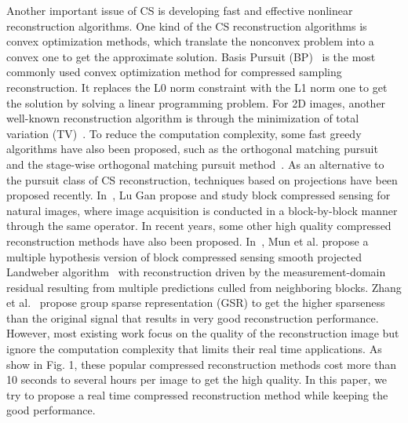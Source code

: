 \documentclass[5pt]{article}
\begin{document}
Another important issue of CS is developing fast and effective nonlinear reconstruction algorithms. One kind of the CS reconstruction algorithms is convex optimization methods, which translate the nonconvex problem into a convex one to get the approximate solution. Basis Pursuit (BP)~\cite{rf6} is the most commonly used convex optimization method for compressed sampling reconstruction. It replaces the L0 norm constraint with the L1 norm one to get the solution by solving a linear programming problem. For 2D images, another well-known reconstruction algorithm is through the minimization of total variation (TV)~\cite{rf7}. To reduce the computation complexity, some fast greedy algorithms have also been proposed, such as the orthogonal matching pursuit~\cite{rf8} and the stage-wise orthogonal matching pursuit method~\cite{rf9}. As an alternative to the pursuit class of CS reconstruction, techniques based on projections have been proposed recently. In~\cite{rf1}, Lu Gan propose and study block compressed sensing for natural images, where image acquisition is conducted in a block-by-block manner through the same operator. In recent years, some other high quality compressed reconstruction methods have also been proposed. In~\cite{rf10}, Mun et al. propose a multiple hypothesis version of block compressed sensing smooth projected Landweber algorithm~\cite{rf1} with reconstruction driven by the measurement-domain residual resulting from multiple predictions culled from neighboring blocks. Zhang et al.~\cite{rf11} propose group sparse representation (GSR) to get the higher sparseness than the original signal that results in very good reconstruction performance. However, most existing work focus on the quality of the reconstruction image but ignore the computation complexity that limits their real time applications. As show in Fig. 1, these popular compressed reconstruction methods cost more than 10 seconds to several hours per image to get the high quality. In this paper, we try to propose a real time compressed reconstruction method while keeping the good performance.
\end{document}

